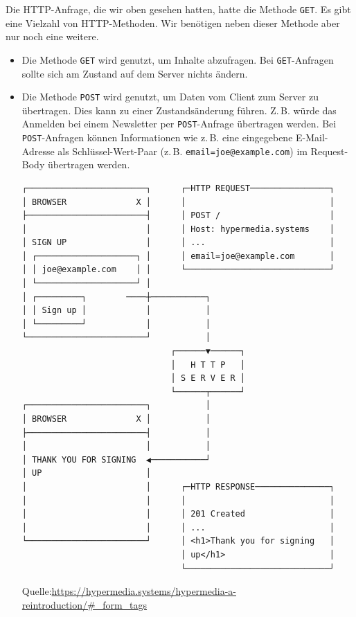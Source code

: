 \documentclass[a4paper]{scrartcl}
\begin{document}
Die HTTP-Anfrage, die wir oben gesehen hatten, hatte die Methode \texttt{GET}.
Es gibt eine Vielzahl von HTTP-Methoden.
Wir benötigen neben dieser Methode aber nur noch eine weitere.

\begin{itemize}
\item Die Methode \texttt{GET} wird genutzt, um Inhalte abzufragen.
Bei \texttt{GET}-Anfragen sollte sich am Zustand auf dem Server nichts ändern.

\item Die Methode \texttt{POST} wird genutzt, um Daten vom Client zum Server zu übertragen.
Dies kann zu einer Zustandsänderung führen.
Z.\,B. würde das Anmelden bei einem Newsletter per \texttt{POST}-Anfrage übertragen werden.
Bei \texttt{POST}-Anfragen können Informationen wie z.\,B. eine eingegebene E-Mail-Adresse als Schlüssel-Wert-Paar (z.\,B. \texttt{email=joe@example.com}) im Request-Body übertragen werden.

\pagebreak
\begin{Verbatim}[label={verb:verbatim}]
┌────────────────────────┐      ┌─HTTP REQUEST────────────────┐
│ BROWSER              X │      │                             │
├────────────────────────┤      │ POST /                      │
│                        │      │ Host: hypermedia.systems    │
│ SIGN UP                │      │ ...                         │
│ ┌────────────────────┐ │      │ email=joe@example.com       │
│ │ joe@example.com    │ │      └─────────────────────────────┘
│ └────────────────────┘ │
│ ┌─────────┐        ────┼───────────┐
│ │ Sign up │            │           │
│ └─────────┘            │           │
└────────────────────────┘           │
                              ┌──────▼──────┐
                              │   H T T P   │
                              │ S E R V E R │
                              └──────┬──────┘
┌────────────────────────┐           │
│ BROWSER              X │           │
├────────────────────────┤           │
│                        │           │
│ THANK YOU FOR SIGNING  ◀───────────┘
│ UP                     │
│                        │      ┌─HTTP RESPONSE───────────────┐
│                        │      │                             │
│                        │      │ 201 Created                 │
│                        │      │ ...                         │
└────────────────────────┘      │ <h1>Thank you for signing   │
                                │ up</h1>                     │
                                └─────────────────────────────┘
\end{Verbatim}
\tiny{Quelle:\url{https://hypermedia.systems/hypermedia-a-reintroduction/#_form_tags}}
\end{itemize}
\end{document}
